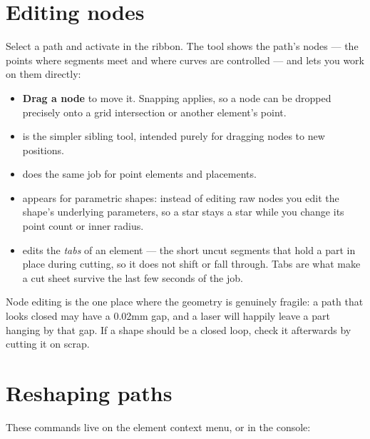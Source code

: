 \section{Editing nodes}

Select a path and activate  in the ribbon. The tool shows the
path's nodes --- the points where segments meet and where curves are controlled
--- and lets you work on them directly:

\begin{itemize}
  \item \textbf{Drag a node} to move it. Snapping applies, so a node can be
        dropped precisely onto a grid intersection or another element's point.
  \item \textbf{} is the simpler sibling tool, intended purely for
        dragging nodes to new positions.
  \item \textbf{} does the same job for point elements and
        placements.
  \item \textbf{} appears for parametric shapes: instead of
        editing raw nodes you edit the shape's underlying parameters, so a star
        stays a star while you change its point count or inner radius.
  \item \textbf{} edits the \emph{tabs} of an element --- the short
        uncut segments that hold a part in place during cutting, so it does not
        shift or fall through. Tabs are what make a cut sheet survive the last
        few seconds of the job.
\end{itemize}

\noindent Node editing is the one place where the geometry is genuinely fragile:
a path that looks closed may have a 0.02\unit{mm} gap, and a laser will happily
leave a part hanging by that gap. If a shape should be a closed loop, check it
afterwards by cutting it on scrap.

\section{Reshaping paths}

These commands live on the element context menu, or in the console:

